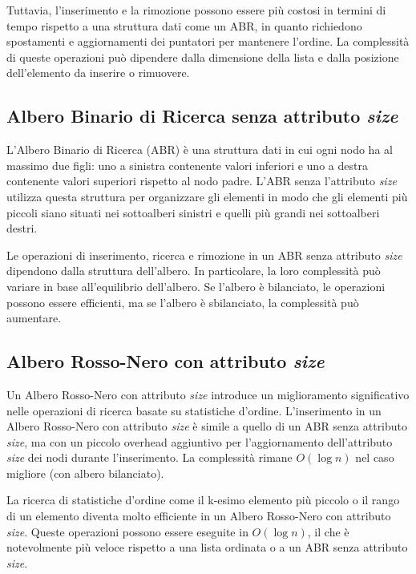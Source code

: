 \documentclass[twocolumn]{article}
\begin{document}
Tuttavia, l'inserimento e la rimozione possono essere più costosi in termini di tempo rispetto a una struttura dati come un ABR, in quanto richiedono spostamenti e aggiornamenti dei puntatori per mantenere l'ordine. La complessità di queste operazioni può dipendere dalla dimensione della lista e dalla posizione dell'elemento da inserire o rimuovere.

\subsection{Albero Binario di Ricerca senza attributo \textit{size}}

L'Albero Binario di Ricerca (ABR) è una struttura dati in cui ogni nodo ha al massimo due figli: uno a sinistra contenente valori inferiori e uno a destra contenente valori superiori rispetto al nodo padre. L'ABR senza l'attributo \textit{size} utilizza questa struttura per organizzare gli elementi in modo che gli elementi più piccoli siano situati nei sottoalberi sinistri e quelli più grandi nei sottoalberi destri.

Le operazioni di inserimento, ricerca e rimozione in un ABR senza attributo \textit{size} dipendono dalla struttura dell'albero. In particolare, la loro complessità può variare in base all'equilibrio dell'albero. Se l'albero è bilanciato, le operazioni possono essere efficienti, ma se l'albero è sbilanciato, la complessità può aumentare.

\subsection{Albero Rosso-Nero con attributo \textit{size}}

Un Albero Rosso-Nero con attributo \textit{size} introduce un miglioramento significativo nelle operazioni di ricerca basate su statistiche d'ordine. L'inserimento in un Albero Rosso-Nero con attributo \textit{size} è simile a quello di un ABR senza attributo \textit{size}, ma con un piccolo overhead aggiuntivo per l'aggiornamento dell'attributo \textit{size} dei nodi durante l'inserimento. La complessità rimane $O(\log n)$ nel caso migliore (con albero bilanciato).

La ricerca di statistiche d'ordine come il k-esimo elemento più piccolo o il rango di un elemento diventa molto efficiente in un Albero Rosso-Nero con attributo \textit{size}. Queste operazioni possono essere eseguite in $O(\log n)$, il che è notevolmente più veloce rispetto a una lista ordinata o a un ABR senza attributo \textit{size}.
\end{document}
